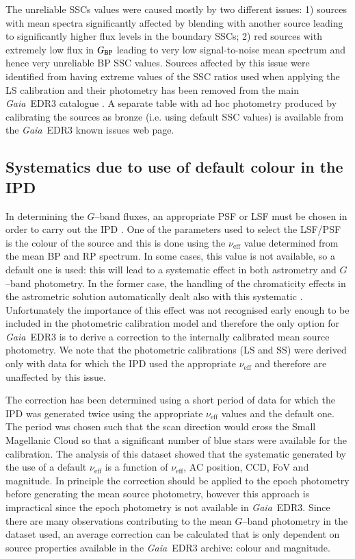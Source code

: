 \documentclass{aa}
\newcommand{\gaia}{\textit{Gaia}\xspace}
\newcommand{\gband}{$G$--band\xspace}
\newcommand{\gbp}{\ensuremath{G_{\rm BP}}\xspace}
\newcommand{\edr}{\gaia~EDR3\xspace}
\newcommand{\xp}{BP and RP\xspace}
\newcommand{\nueff}{\ensuremath{\nu_\text{eff}}\xspace}
\begin{document}
The unreliable SSCs values were caused mostly by two different issues: 1) sources with mean spectra significantly affected by blending with another source leading to significantly higher flux levels in the boundary SSCs; 2) red sources with extremely low flux in \gbp leading to very low signal-to-noise mean spectrum and hence very unreliable BP SSC values. Sources affected by this issue were identified from having extreme values of the SSC ratios used when applying the LS calibration and their photometry has been removed from the main \edr catalogue \citep[see][for more information]{EDR3_CU9}. 
A separate table with ad hoc photometry produced by calibrating the sources as bronze (i.e. using default SSC values) is available from the \edr known issues web page.

\subsection{Systematics due to use of default colour in the IPD}\label{sec:defaultNuEff}

In determining the \gband fluxes, an appropriate PSF or LSF must be chosen in order to carry out the IPD \citep{EDR3_PSF}. One of the parameters used to select the LSF/PSF is the colour of the source and this is done using the \nueff value determined from the mean \xp spectrum. In some cases, this value is not available, so a default one is used: this will lead to a systematic effect in both astrometry and \gband photometry. In the former case, the handling of the chromaticity effects in the astrometric solution automatically dealt also with this systematic \citep{DPACP-128}. Unfortunately the importance of this effect was not recognised early enough to be included in the photometric calibration model and therefore the only option for \edr is to derive a correction to the internally calibrated mean source photometry. We note that the photometric calibrations (LS and SS) were derived only with data for which the IPD used the appropriate \nueff and therefore are unaffected by this issue.

The correction has been determined using a short period of data for which the IPD was generated twice using the appropriate \nueff values and the default one. The period was chosen such that the scan direction would cross the Small Magellanic Cloud so that a significant number of blue stars were available for the calibration. The analysis of this dataset showed that the systematic generated by the use of a default \nueff is a function of \nueff, AC position, CCD, FoV and magnitude. In principle the correction should be applied to the epoch photometry before generating the mean source photometry, however this approach is impractical since the epoch photometry is not available in \edr. Since there are many observations contributing to the mean \gband photometry in the dataset used, an average correction can be calculated that is only dependent on source properties available in the \edr archive: colour and magnitude. 
\end{document}
